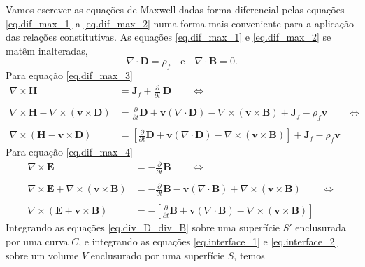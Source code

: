 Vamos escrever as equa\c{c}\~oes de Maxwell dadas forma diferencial pelas equa\c{c}\~oes \ref{eq.dif_max_1} a \ref{eq.dif_max_2} numa forma mais conveniente para a aplica\c{c}\~ao das rela\c{c}\~oes constitutivas. As equa\c{c}\~oes \ref{eq.dif_max_1} e \ref{eq.dif_max_2} se mat\^em inalteradas,
\begin{equation}\label{eq.div_D_div_B}
\nabla\cdot\mathbf{D}=\rho_f\quad\text{e}\quad\nabla\cdot\mathbf{B}=0.
\end{equation}
Para equa\c{c}\~ao \ref{eq.dif_max_3}
\begin{align}\label{eq.interface_1}\nonumber
\nabla\times\mathbf{H}&=\mathbf{J}_f+\frac{\partial}{\partial t}\,\mathbf{D}\qquad\Leftrightarrow\\\nonumber\\
\nabla\times\mathbf{H}-\nabla\times(\mathbf{v}\times\mathbf{D})&=\frac{\partial}{\partial t}\mathbf{D}+\mathbf{v}(\nabla\cdot\mathbf{D})-\nabla\times(\mathbf{v}\times\mathbf{B})+\mathbf{J}_f-\rho_f\mathbf{v}\qquad\Leftrightarrow\\\nonumber\\
\nabla\times(\mathbf{H}-\mathbf{v}\times\mathbf{D})&=\left[\frac{\partial}{\partial t}\mathbf{D}+\mathbf{v}(\nabla\cdot\mathbf{D})-\nabla\times(\mathbf{v}\times\mathbf{B})\right]+\mathbf{J}_f-\rho_f\mathbf{v}
\end{align}
Para equa\c{c}\~ao \ref{eq.dif_max_4}
\begin{align}\label{eq.interface_2}\nonumber
\nabla\times\mathbf{E}&=-\frac{\partial}{\partial t}\mathbf{B}\qquad\Leftrightarrow\\\nonumber\\
\nabla\times\mathbf{E}+\nabla\times(\mathbf{v}\times\mathbf{B})&=-\frac{\partial}{\partial t}\mathbf{B}-\mathbf{v}(\nabla\cdot\mathbf{B})+\nabla\times(\mathbf{v}\times\mathbf{B})\qquad\Leftrightarrow\\\nonumber\\
\nabla\times(\mathbf{E}+\mathbf{v}\times\mathbf{B})&=-\left[\frac{\partial}{\partial t}\mathbf{B}+\mathbf{v}(\nabla\cdot\mathbf{B})-\nabla\times(\mathbf{v}\times\mathbf{B})\right]
\end{align}
Integrando as equa\c{c}\~oes \ref{eq.div_D_div_B} sobre uma superf\'icie $S'$ enclusurada por uma curva $C$, e integrando as equa\c{c}\~oes \ref{eq.interface_1} e \ref{eq.interface_2} sobre um volume $V$ enclusurado por uma superf\'icie $S$, temos
